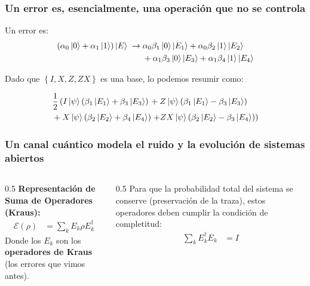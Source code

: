 \documentclass[english,9pt]{Linnaeus}
\begin{document}
    \begin{frame}[allowframebreaks]
      \frametitle{Un error es, esencialmente, una operación que no se controla}
      Un error es:
      \begin{align}
        \begin{split}
          (\alpha_0\ket{0} + \alpha_1\ket{1})\ket{E} \;\to\; &\alpha_0\beta_1 \ket{0}\ket{E_1} + \alpha_0\beta_2 \ket{1}\ket{E_2}\\
          &+ \alpha_1\beta_3 \ket{0}\ket{E_3} + \alpha_1\beta_4 \ket{1}\ket{E_4}
        \end{split}
      \end{align}

      Dado que $\left\{I, X, Z, ZX\right\}$ es una base, lo podemos resumir como:

      \begin{align}
        \begin{split}
          &\frac{1}{2} \left(I\ket{\psi}\left(\beta_1 \ket{E_1} + \beta_3 \ket{E_3}\right)\right.
          + Z\ket{\psi}\left(\beta_1 \ket{E_1} - \beta_3 \ket{E_3}\right)\\
          & + X\ket{\psi}\left(\beta_2 \ket{E_2} + \beta_4 \ket{E_4}\right)
          \left. + ZX\ket{\psi}\left(\beta_2 \ket{E_2} - \beta_3 \ket{E_4}\right)\right)
        \end{split}
      \end{align}
    \end{frame}

    \begin{frame}[allowframebreaks]
      \frametitle{Un canal cuántico modela el ruido y la evolución de sistemas abiertos}
      \begin{columns}[c]
        \begin{column}{0.5\textwidth}
          \textbf{Representación de Suma de Operadores (Kraus):}
          \begin{align}
            \mathcal{E}(\rho) &= \sum_{k} E_k \rho E_k^\dagger
          \end{align}
          Donde los $E_k$ son los \textbf{operadores de Kraus} (los errores que vimos antes).
        \end{column}

        \begin{column}{0.5\textwidth}
          Para que la probabilidad total del sistema se conserve (preservación de la traza), estos operadores deben cumplir la condición de completitud:
          \begin{align}
            \sum_{k} E_k^\dagger E_k &= I
          \end{align}
        \end{column}
      \end{columns}
    \end{frame}
\end{document}
